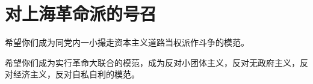 \section[对上海革命派的号召（一九六七年五月）]{对上海革命派的号召}


希望你们成为同党内一小撮走资本主义道路当权派作斗争的模范。

希望你们成为实行革命大联合的模范，成为反对小团体主义，反对无政府主义，反对经济主义，反对自私自利的模范。



